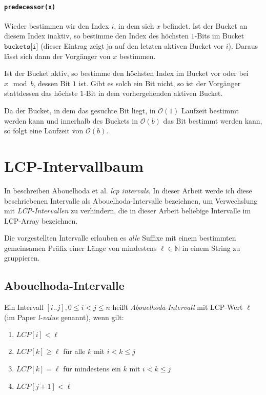 \paragraph{\texttt{predecessor(x)}}

Wieder bestimmen wir den Index $i$, in dem sich $x$ befindet. Ist der Bucket an diesem Index inaktiv, so bestimme den Index des höchsten $1$-Bits im Bucket $\texttt{buckets[i]}$ (dieser Eintrag zeigt ja auf den letzten aktiven Bucket vor $i$). Daraus lässt sich dann der Vorgänger von $x$ bestimmen.

Ist der Bucket aktiv, so bestimme den höchsten Index im Bucket vor oder bei $x \mod b$, dessen Bit $1$ ist. Gibt es solch ein Bit nicht, so ist der Vorgänger stattdessen das höchste $1$-Bit in dem vorhergehenden aktiven Bucket.

Da der Bucket, in dem das gesuchte Bit liegt, in $\mathcal{O}(1)$ Laufzeit bestimmt werden kann und innerhalb des Buckets in $\mathcal{O}(b)$ das Bit bestimmt werden kann, so folgt eine Laufzeit von $\mathcal{O}(b)$.

\section{LCP-Intervallbaum}
\label{lcpintervals}

In \cite{abouelhoda_optimal_2002} beschreiben Abouelhoda et al. \textit{lcp intervals}. In dieser Arbeit werde ich diese beschriebenen Intervalle als Abouelhoda-Intervalle bezeichnen, um Verwechslung mit \textit{LCP-Intervallen} zu verhindern, die in dieser Arbeit beliebige Intervalle im LCP-Array bezeichnen.

Die vorgestellten Intervalle erlauben es \emph{alle} Suffixe mit einem bestimmten gemeinsamen Präfix einer Länge von mindestens $\ell \in \mathbb{N}$ in einem String zu gruppieren.

\subsection{Abouelhoda-Intervalle}
\label{abouelhodaintervals}

Ein Intervall $[i..j], 0 \leq i < j \leq n$ heißt \textit{Abouelhoda-Intervall} mit LCP-Wert $\ell$ (im Paper \textit{l-value} genannt), wenn gilt:

\begin{enumerate}
	\item $LCP[i] < \ell$
	\item $LCP[k] \geq \ell$ für alle $k$ mit $i < k \leq j$
	\item $LCP[k] = \ell$ für mindestens ein $k$ mit $i < k \leq j$
	\item $LCP[j + 1] < \ell$
\end{enumerate}

